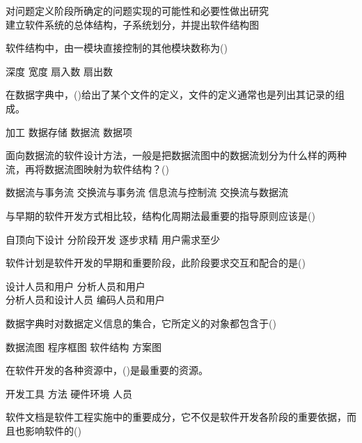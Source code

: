 \documentclass[answer]{exam}
\begin{document}
\begin{questions}
\begin{oneparchoices}
		\choice 对问题定义阶段所确定的问题实现的可能性和必要性做出研究\\
		\choice 建立软件系统的总体结构，子系统划分，并提出软件结构图
	\end{oneparchoices}
	\question 软件结构中，由一模块直接控制的其他模块数称为()\\
	\begin{oneparchoices}
		\choice 深度
		\choice 宽度
		\choice 扇入数
		\choice 扇出数
	\end{oneparchoices}
	\question 在数据字典中，()给出了某个文件的定义，文件的定义通常也是列出其记录的组成。\\
	\begin{oneparchoices}
		\choice 加工
		\choice 数据存储
		\choice 数据流
		\choice 数据项
	\end{oneparchoices}
	\question 面向数据流的软件设计方法，一般是把数据流图中的数据流划分为什么样的两种流，再将数据流图映射为软件结构？()\\
	\begin{oneparchoices}
		\choice 数据流与事务流
		\choice 交换流与事务流
		\choice 信息流与控制流
		\choice 交换流与数据流
	\end{oneparchoices}
	\question 与早期的软件开发方式相比较，结构化周期法最重要的指导原则应该是()\\
	\begin{oneparchoices}
		\choice 自顶向下设计
		\choice 分阶段开发
		\choice 逐步求精
		\choice 用户需求至少
	\end{oneparchoices}
	\question 软件计划是软件开发的早期和重要阶段，此阶段要求交互和配合的是()\\
	\begin{oneparchoices}
		\choice 设计人员和用户
		\choice 分析人员和用户\\
		\choice 分析人员和设计人员
		\choice 编码人员和用户
	\end{oneparchoices}
	\question 数据字典时对数据定义信息的集合，它所定义的对象都包含于()\\
	\begin{oneparchoices}
		\choice 数据流图
		\choice 程序框图
		\choice 软件结构
		\choice 方案图
	\end{oneparchoices}
	\question 在软件开发的各种资源中，()是最重要的资源。\\
	\begin{oneparchoices}
		\choice 开发工具
		\choice 方法
		\choice 硬件环境
		\choice 人员
	\end{oneparchoices}
	\question 软件文档是软件工程实施中的重要成分，它不仅是软件开发各阶段的重要依据，而且也影响软件的()\\

\end{questions}
\end{document}
